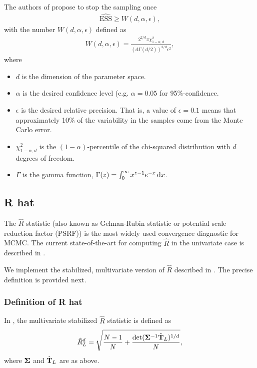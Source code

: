 \documentclass[10pt]{article}
\numberwithin{equation}{section}
\begin{document}
The authors of \cite{VatFleJon19} propose to stop the sampling once
\begin{align*}
\widehat{\mathrm{ESS}} \geq W(d, \alpha, \epsilon),
\end{align*}
with the number $W(d, \alpha, \epsilon)$ defined as 
\begin{align}
W(d, \alpha, \epsilon) = \frac{2^{2/d} \pi \chi^2_{1-\alpha,d}}{(d \Gamma(d/2))^{2/d} \epsilon^2}, \label{eq:w_d_alpha_epsilon}
\end{align}
where
\begin{itemize}
\item $d$ is the dimension of the parameter space.
\item $\alpha$ is the desired confidence level (e.g. $\alpha=0.05$ for 95\%-confidence.
\item $\epsilon$ is the desired relative precision. That is, a value of $\epsilon=0.1$ means that approximately 10\% of the variability in the samples come from the Monte Carlo error.
\item $\chi^2_{1-\alpha, d}$ is the $(1-\alpha)$-percentile of the chi-squared distribution with $d$ degrees of freedom.
\item $\Gamma$ is the gamma function, $\Gamma(z) = \int_0^\infty x^{z-1} e^{-x} \,\mathrm d x$.
\end{itemize}

\subsection{R hat}

The $\hat R$ statistic (also known as Gelman-Rubin statistic or  potential scale reduction factor (PSRF)) is the most widely used convergence diagnostic for MCMC. The current state-of-the-art for computing $\hat R$ in the univariate case is described in \cite{VehGelSimCarBur21}.

We implement the stabilized, multivariate version of $\hat R$ described in \cite{VatKnu21}. The precise definition is provided next.

\subsubsection*{Definition of R hat}

In \cite{VatKnu21}, the multivariate stabilized $\hat R$ statistic is defined as
\begin{align*}
\hat R^d_L = \sqrt{ \frac{N-1}{N} + \frac{\det(\mathbf{\Sigma}^{-1} \hat{\mathbf{T}}_L)^{1/d}}{N} },
\end{align*}
where $\mathbf{\Sigma}$ and $\hat{\mathbf{T}}_L$ are as above.
\end{document}
